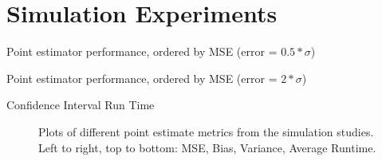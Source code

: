 
\section{Simulation Experiments}

\begin{table}[ht]
    \centering
    \caption{Point estimator performance, ordered by MSE (error = $0.5*\sigma$)}
    
    \label{tab:table-sim-exp-point-error0.5}
\end{table}

\begin{table}[ht]
    \centering
    \caption{Point estimator performance, ordered by MSE (error = $2*\sigma$)}
    
    \label{tab:table-sim-exp-point-error2}
\end{table}

\begin{table}[ht]
    \centering
    \caption{Confidence Interval Run Time}
    
    \label{tab:table-sim-exp-runtime}
\end{table}
\clearpage

\begin{figure}[ht]
    \centering
    
    \caption{Plots of different point estimate metrics from the simulation studies. Left to right, top to bottom: MSE, Bias, Variance, Average Runtime.}
    \label{fig:sim-exp-grid}
\end{figure}

